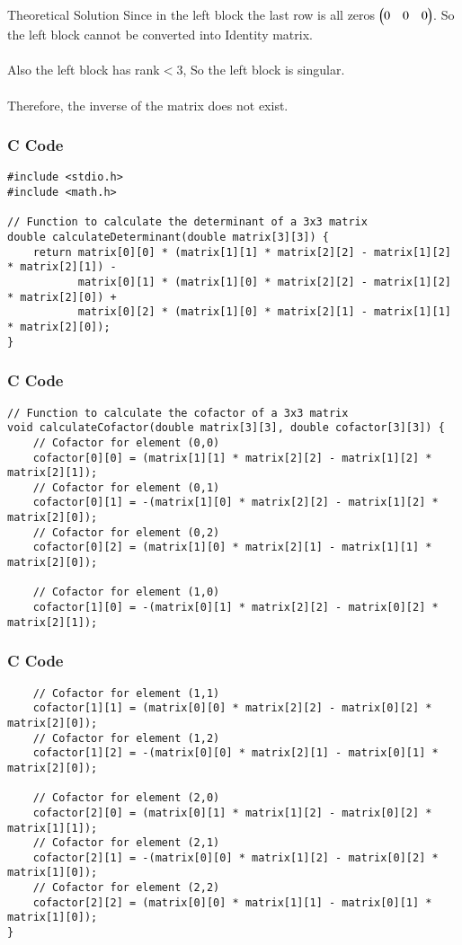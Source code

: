 \documentclass{beamer}
\begin{document}
\begin{frame}{Theoretical Solution}
Since in the left block the last row is all zeros $\begin{pmatrix}0 & 0 & 0\end{pmatrix}$. So the left block cannot be converted into Identity matrix.
\\\\
Also the left block has rank$<$3, So the left block is singular.
\\\\
Therefore, the inverse of the matrix does not exist.
\end{frame}

\begin{frame}[fragile]
\frametitle{C Code}
\begin{lstlisting}
#include <stdio.h>
#include <math.h>

// Function to calculate the determinant of a 3x3 matrix
double calculateDeterminant(double matrix[3][3]) {
    return matrix[0][0] * (matrix[1][1] * matrix[2][2] - matrix[1][2] * matrix[2][1]) -
           matrix[0][1] * (matrix[1][0] * matrix[2][2] - matrix[1][2] * matrix[2][0]) +
           matrix[0][2] * (matrix[1][0] * matrix[2][1] - matrix[1][1] * matrix[2][0]);
}
\end{lstlisting}
\end{frame}

\begin{frame}[fragile]
\frametitle{C Code}
\begin{lstlisting}
// Function to calculate the cofactor of a 3x3 matrix
void calculateCofactor(double matrix[3][3], double cofactor[3][3]) {
    // Cofactor for element (0,0)
    cofactor[0][0] = (matrix[1][1] * matrix[2][2] - matrix[1][2] * matrix[2][1]);
    // Cofactor for element (0,1)
    cofactor[0][1] = -(matrix[1][0] * matrix[2][2] - matrix[1][2] * matrix[2][0]);
    // Cofactor for element (0,2)
    cofactor[0][2] = (matrix[1][0] * matrix[2][1] - matrix[1][1] * matrix[2][0]);

    // Cofactor for element (1,0)
    cofactor[1][0] = -(matrix[0][1] * matrix[2][2] - matrix[0][2] * matrix[2][1]);
\end{lstlisting}
\end{frame}

\begin{frame}[fragile]
\frametitle{C Code}
\begin{lstlisting}    
    // Cofactor for element (1,1)
    cofactor[1][1] = (matrix[0][0] * matrix[2][2] - matrix[0][2] * matrix[2][0]);
    // Cofactor for element (1,2)
    cofactor[1][2] = -(matrix[0][0] * matrix[2][1] - matrix[0][1] * matrix[2][0]);
    
    // Cofactor for element (2,0)
    cofactor[2][0] = (matrix[0][1] * matrix[1][2] - matrix[0][2] * matrix[1][1]);
    // Cofactor for element (2,1)
    cofactor[2][1] = -(matrix[0][0] * matrix[1][2] - matrix[0][2] * matrix[1][0]);
    // Cofactor for element (2,2)
    cofactor[2][2] = (matrix[0][0] * matrix[1][1] - matrix[0][1] * matrix[1][0]);
}
\end{lstlisting}
\end{frame}
\end{document}
